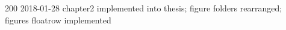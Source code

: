 \begin{footnotesize}
200	2018-01-28	chapter2 implemented into thesis; figure folders rearranged; figures floatrow implemented\\

\end{footnotesize}
